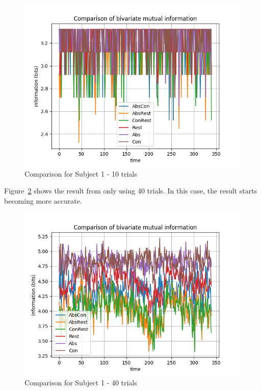 \begin{figure}[!htb]
\caption{Comparison for Subject 1 - 10 trials}
\label{10-trials}
    \centering
    \includegraphics[width=\textwidth]{fig/subject1_10trials_all-channel-1}
\end{figure}

Figure~\ref{40-trials} shows the result from only using 40 trials. In this case, the result starts becoming more accurate.

\begin{figure}[!htb]
\caption{Comparison for Subject 1 - 40 trials}
\label{40-trials}
    \centering
    \includegraphics[width=\textwidth]{fig/subject1_40trials_all-channel-1}
\end{figure}


